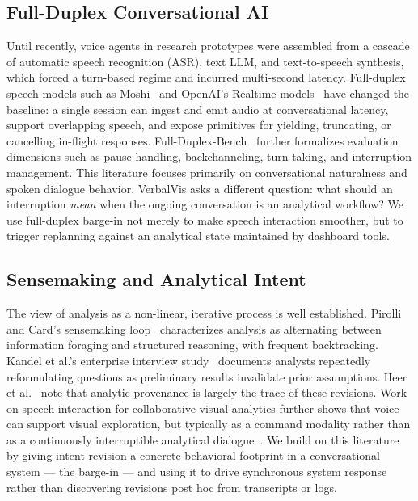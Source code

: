 \documentclass[journal]{IEEEtran}
\begin{document}
\subsection{Full-Duplex Conversational AI}
Until recently, voice agents in research prototypes were assembled from a cascade of automatic speech recognition (ASR), text LLM, and text-to-speech synthesis, which forced a turn-based regime and incurred multi-second latency. Full-duplex speech models such as Moshi~\cite{defossez2024moshi} and OpenAI's Realtime models~\cite{openai_gptrealtime_blog,openai_realtime_docs} have changed the baseline: a single session can ingest and emit audio at conversational latency, support overlapping speech, and expose primitives for yielding, truncating, or cancelling in-flight responses. Full-Duplex-Bench~\cite{lin2025fdbench} further formalizes evaluation dimensions such as pause handling, backchanneling, turn-taking, and interruption management. This literature focuses primarily on conversational naturalness and spoken dialogue behavior. VerbalVis asks a different question: what should an interruption \emph{mean} when the ongoing conversation is an analytical workflow? We use full-duplex barge-in not merely to make speech interaction smoother, but to trigger replanning against an analytical state maintained by dashboard tools.

\subsection{Sensemaking and Analytical Intent}
The view of analysis as a non-linear, iterative process is well established. Pirolli and Card's sensemaking loop~\cite{pirolli2005sensemaking} characterizes analysis as alternating between information foraging and structured reasoning, with frequent backtracking. Kandel et al.'s enterprise interview study~\cite{kandel2012enterprise} documents analysts repeatedly reformulating questions as preliminary results invalidate prior assumptions. Heer et al.~\cite{heer2008graphical} note that analytic provenance is largely the trace of these revisions. Work on speech interaction for collaborative visual analytics further shows that voice can support visual exploration, but typically as a command modality rather than as a continuously interruptible analytical dialogue~\cite{molinaleon2025talktothewall}. We build on this literature by giving intent revision a concrete behavioral footprint in a conversational system --- the barge-in --- and using it to drive synchronous system response rather than discovering revisions post hoc from transcripts or logs.
\end{document}
